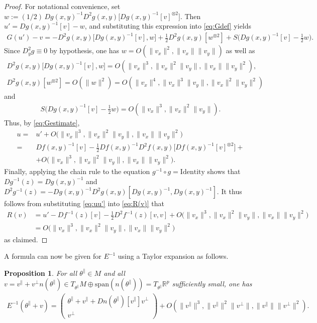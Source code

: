 \documentclass{article}
\newcommand{\RB}{\mathbb{R}}
\newcommand{\tpa}{\theta^{\parallel}}
\theoremstyle{plain}
\newtheorem{proposition}[theorem]{Proposition}
\theoremstyle{definition}
\theoremstyle{remark}
\begin{document}
\begin{proof}
    For notational convenience, set $w:=(1/2)\,Dg(x,y)^{-1}D^2g(x,y)\big[Dg(x,y)^{-1}[v]^{\otimes 2}\big]$. Then $u' = Dg(x,y)^{-1}[v]-w$, and substituting this expression into \eqref{eq:Gdef} yields 
    \begin{align}
        G(u')-v = -D^2g(x,y)\big[Dg(x,y)^{-1}[v], w\big] + \frac{1}{2}D^2g(x,y)[w^{\otimes 2}] + S\bigg(Dg(x,y)^{-1}[v] - \frac{1}{2}w\bigg).
    \end{align}
    Since $D^2_yg\equiv0$ by hypothesis, one has $w = O(\|v_x\|^2,\|v_x\|\|v_y\|)$ as well as
    \begin{align}
        D^2g(x,y)\big[Dg(x,y)^{-1}[v],w\big] = O(\|v_x\|^3,\|v_x\|^2\|v_y\|,\|v_x\|\|v_y\|^2),
    \end{align}
    \begin{align}
        D^2g(x,y)[w^{\otimes 2}] = O(\|w\|^2) = O(\|v_x\|^4,\|v_x\|^3\|v_y\|,\|v_x\|^2\|v_y\|^2)
    \end{align}
    and
    \begin{align}
        S\bigg(Dg(x,y)^{-1}[v]-\frac{1}{2}w\bigg) = O(\|v_x\|^3,\|v_x\|^2\|v_y\|).
    \end{align}
    Thus, by \eqref{eq:Gestimate},
    \begin{align}
        u =& u'+O\big(\|v_x\|^3,\|v_x\|^2\|v_y\|,\|v_x\|\|v_y\|^2\big)\\=&Df(x,y)^{-1}[v]-\frac{1}{2}Df(x,y)^{-1}D^2f(x,y)\big[Df(x,y)^{-1}[v]^{\otimes 2}\big]+\\&+ O\big(\|v_x\|^3,\|v_x\|^2\|v_y\|,\|v_x\|\|v_y\|^2\big).\label{eq:uu'}
    \end{align}
    Finally, applying the chain rule to the equation $g^{-1}\circ g = \text{Identity}$ shows that $Dg^{-1}(z) = Dg(x,y)^{-1}$ and $D^2g^{-1}(z) = -Dg(x,y)^{-1}D^2g(x,y)[Dg(x,y)^{-1},Dg(x,y)^{-1}]$. It thus follows from substituting \eqref{eq:uu'} into \eqref{eq:R(v)} that
    \begin{align}
        R(v) &= u'-Df^{-1}(z)[v]-\frac{1}{2}D^2f^{-1}(z)[v,v]+O\big(\|v_x\|^3,\|v_x\|^2\|v_y\|,\|v_x\|\|v_y\|^2\big)\\&=O\big(\|v_x\|^3,\|v_x\|^2\|v_y\|,\|v_x\|\|v_y\|^2\big)
    \end{align}
    as claimed.
\end{proof}

A formula can now be given for $E^{-1}$ using a Taylor expansion as follows.

\begin{proposition}\label{prop:Einv}
    For all $\tpa\in M$ and all $v = v^{\parallel}+v^{\perp}n(\tpa)\in T_{\tpa}M\oplus  \text{span}(n(\tpa)) = T_{\tpa}\RB^p$ sufficiently small, one has
    \begin{align}
        E^{-1}(\tpa+v) = \begin{pmatrix} \tpa +v^{\parallel} + Dn(\tpa)[v^{\parallel}]v^{\perp} \\ v^{\perp}
        \end{pmatrix} + O(\|v^{\parallel}\|^3,\|v^{\parallel}\|^2\|v^{\perp}\|,\|v^{\parallel}\|\|v^{\perp}\|^2).
    \end{align}
\end{proposition}
\end{document}
